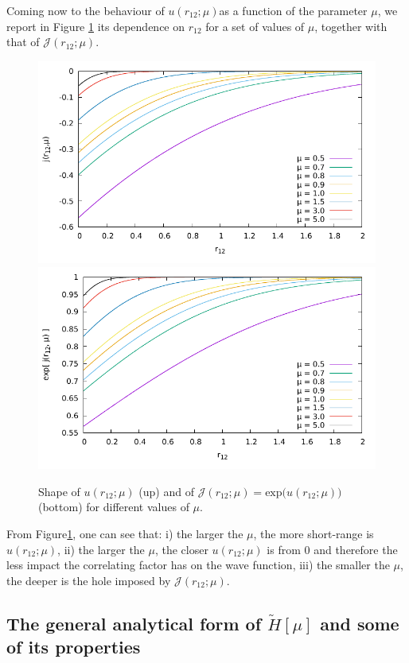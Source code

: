 \documentclass[aip,jcp,reprint,noshowkeys,superscriptaddress]{revtex4-1}
\begin{document}
Coming now to the behaviour of $u(r_{12};\mu)$as a function of the parameter $\mu$, we report in Figure \ref{fig_j_mu} its dependence on $r_{12}$ for a set of values of $\mu$, together with that of $\mathcal{J}(r_{12};\mu)$. 
\begin{figure}
 \label{fig_j_mu}
        \includegraphics[width=0.45\linewidth]{small_mu_j.pdf}
        \includegraphics[width=0.45\linewidth]{small_mu_exp_j.pdf}\\
        \caption{Shape of $u(r_{12};\mu)$ (up) and of $\mathcal{J}(r_{12};\mu) = \text{exp}\bigg(u(r_{12};\mu) \bigg) $ (bottom) for different values of $\mu$.}
\end{figure}
From Figure\ref{fig_j_mu}, one can see that: i) the larger the $\mu$, the more short-range is $u(r_{12};\mu)$, ii) the larger the $\mu$, the closer $u(r_{12};\mu)$ is from 0 and therefore the less impact the correlating factor has on the wave function, iii) the smaller the $\mu$, the deeper is the hole imposed by $\mathcal{J}(r_{12};\mu)$. 


\subsection{The general analytical form of  $\tilde{H}[\mu]$ and some of its properties}
\end{document}
